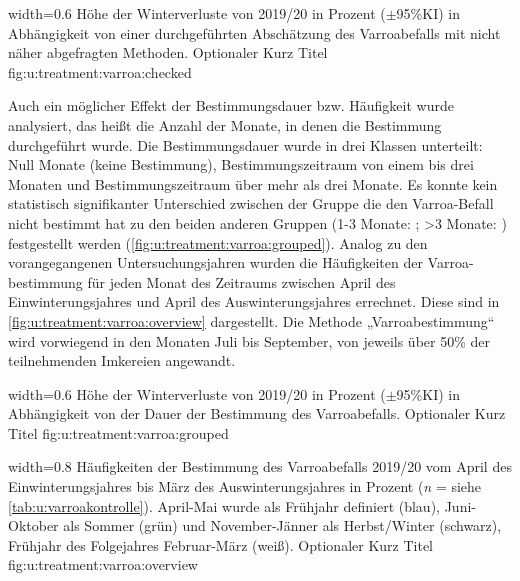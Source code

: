 {width=0.6\textwidth} %
{Höhe der Winterverluste von 2019/20 in Prozent ($\pm$95\%KI) in Abhängigkeit von einer durchgeführten Abschätzung des Varroabefalls mit nicht näher abgefragten Methoden.} %
{Optionaler Kurz Titel} %
{fig:u:treatment:varroa:checked} %

Auch ein möglicher Effekt der Bestimmungsdauer bzw. Häufigkeit wurde analysiert, das heißt die Anzahl der Monate, in denen die Bestimmung durchgeführt wurde. Die Bestimmungsdauer wurde in drei Klassen unterteilt: Null Monate (keine Bestimmung), Bestimmungszeitraum von einem bis drei Monaten und Bestimmungszeitraum über mehr als drei Monate. Es konnte kein statistisch signifikanter Unterschied zwischen der Gruppe die den Varroa-Befall nicht bestimmt hat  zu den beiden anderen Gruppen (1-3 Monate: ; >3 Monate: ) festgestellt werden (\cref{fig:u:treatment:varroa:grouped}). 
\newline
Analog zu den vorangegangenen Untersuchungsjahren wurden die Häufigkeiten der Varroa-bestimmung für jeden Monat des Zeitraums zwischen April des Einwinterungsjahres und April des Auswinterungsjahres errechnet. Diese sind in \cref{fig:u:treatment:varroa:overview} dargestellt. Die Methode „Varroabestimmung`` wird vorwiegend in den Monaten Juli bis September, von jeweils über 50\% der teilnehmenden Imkereien angewandt.

{width=0.6\textwidth} %
{Höhe der Winterverluste von 2019/20 in Prozent ($\pm$95\%KI) in Abhängigkeit von der Dauer der Bestimmung des Varroabefalls.} %
{Optionaler Kurz Titel} %
{fig:u:treatment:varroa:grouped} %

{width=0.8\textwidth} %
{Häufigkeiten der Bestimmung des Varroabefalls 2019/20 vom April des Einwinterungsjahres bis März des Auswinterungsjahres in Prozent (\textit{n} = siehe \cref{tab:u:varroakontrolle}). April-Mai wurde als Frühjahr definiert (blau), Juni-Oktober als Sommer (grün) und November-Jänner als Herbst/Winter (schwarz), Frühjahr des Folgejahres Februar-März (weiß).} %
{Optionaler Kurz Titel} %
{fig:u:treatment:varroa:overview} %

